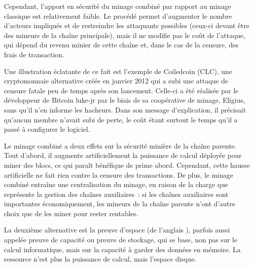 Cependant, l'apport en sécurité du minage combiné par rapport au minage classique est relativement faible. Le procédé permet d'augmenter le nombre d'acteurs impliqués et de restreindre les attaquants possibles (ceux-ci devant être des mineurs de la chaîne principale), mais il ne modifie pas le coût de l'attaque, qui dépend du revenu minier de cette chaîne et, dans le cas de la censure, des frais de transaction.

Une illustration éclatante de ce fait est l'exemple de Coiledcoin (CLC), une cryptomonnaie alternative créée en janvier 2012 qui a subi une attaque de censure fatale peu de temps après son lancement. Celle-ci a été réalisée par le développeur de Bitcoin luke-jr par le biais de sa coopérative de minage, Eligius, sans qu'il n'en informe les hacheurs. Dans son message d'explication, il précisait qu'aucun membre n'avait subi de perte, le coût étant surtout le temps qu'il a passé à configurer le logiciel.

Le minage combiné a deux effets sur la sécurité minière de la chaîne parente. Tout d'abord, il augmente artificiellement la puissance de calcul déployée pour miner des blocs, ce qui paraît bénéfique de prime abord. Cependant, cette hausse artificielle ne fait rien contre la censure des transactions. De plus, le minage combiné entraîne une centralisation du minage, en raison de la charge que représente la gestion des chaînes auxiliaires~: si les chaînes auxiliaires sont importantes économiquement, les mineurs de la chaîne parente n'ont d'autre choix que de les miner pour rester rentables.



La deuxième alternative est la preuve d'espace (de l'anglais ), parfois aussi appelée preuve de capacité ou preuve de stockage, qui se base, non pas sur le calcul informatique, mais sur la capacité à garder des données en mémoire. La ressource n'est plus la puissance de calcul, mais l'espace disque.

